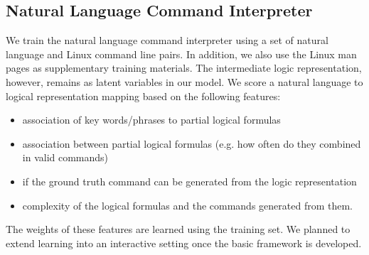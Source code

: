 \subsection{Natural Language Command Interpreter}
We train the natural language command interpreter using a set of natural language and Linux command line pairs. In addition, we also use the Linux man pages as supplementary training materials. The intermediate logic representation, however, remains as latent variables in our model. We score a natural language to logical representation mapping based on the following features:
\begin{itemize}\itemsep-1pt
	\item association of key words/phrases to partial logical formulas
	\item association between partial logical formulas (e.g. how often do they combined in valid commands)
	\item if the ground truth command can be generated from the logic representation
	\item complexity of the logical formulas and the commands generated from them.
\end{itemize}
The weights of these features are learned using the training set. We planned to extend learning into an interactive setting once the basic framework is developed.